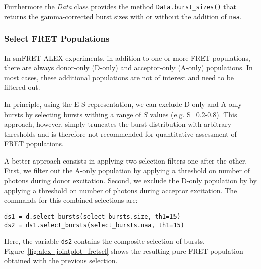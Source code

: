 Furthermore the \textit{Data} class provides the
\href{http://fretbursts.readthedocs.org/en/latest/data_class.html#fretbursts.burstlib.Data.burst_sizes}{method \texttt{Data.burst\_sizes()}} that returns the gamma-corrected burst sizes with or
without the addition of \verb|naa|.

\subsubsection{Select FRET Populations}

In smFRET-ALEX experiments, in addition to one or more FRET populations, there are always
donor-only (D-only) and acceptor-only (A-only) populations. 
In most cases, these additional populations are not of interest and need to be filtered out.

In principle, using the E-S representation, we can exclude D-only and A-only bursts
by selecting bursts withing a range of $S$ values (e.g. S=0.2-0.8). 
This approach, however, simply truncates the burst distribution with arbitrary 
thresholds and is therefore not recommended for quantitative assessment of FRET 
populations.

A better approach consists in applying two selection filters one after the other.
First, we filter out the A-only population 
by applying a threshold on number of photons during donor excitation.
Second, we exclude the D-only population by
by applying a threshold on number of photons during acceptor excitation.
The commands for this combined selections are:

\begin{lstlisting}
ds1 = d.select_bursts(select_bursts.size, th1=15)
ds2 = ds1.select_bursts(select_bursts.naa, th1=15)
\end{lstlisting}

Here, the variable \verb|ds2| contains the composite selection of bursts.
Figure~\ref{fig:alex_jointplot_fretsel} shows the resulting pure FRET
population obtained with the previous selection.